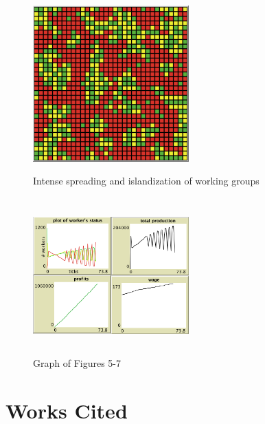 \documentclass[11pt]{article}
\begin{document}
\begin{figure}[htbp]
\centering
	\includegraphics[width=6cm, height=6cm]{end}
	\caption{Intense spreading and islandization of working groups}
	\centering
	\includegraphics[width=6cm, height=6cm]{graph2}
	\caption{Graph of Figures 5-7}
\end{figure}

\newpage


\section{Works Cited} \hrulefill
\end{document}
